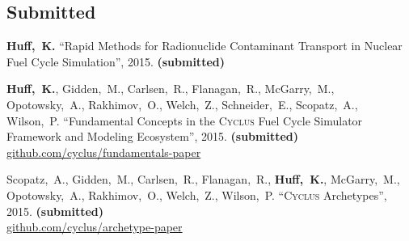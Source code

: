 \documentclass[margin,line]{resume}
\newcommand{\Cyclus}{\textsc{Cyclus}\xspace}%
\begin{document}
\begin{resume}
    \section{\mysidestyle Submitted}
      \begin{bibenum}
       \item \textbf{Huff,~K.} ``Rapid Methods for Radionuclide Contaminant
       Transport in Nuclear Fuel Cycle Simulation'', 2015. \textbf{(submitted)}
       \item \textbf{Huff,~K.}, Gidden,~M., Carlsen,~R., Flanagan,~R.,
       McGarry,~M., Opotowsky,~A., Rakhimov,~O., Welch,~Z., Schneider,~E.,
       Scopatz,~A., Wilson,~P.  ``Fundamental Concepts in the \Cyclus Fuel Cycle
       Simulator Framework and Modeling Ecosystem'', 2015.  \textbf{(submitted)}\\
       \url{github.com/cyclus/fundamentals-paper}
       \item Scopatz,~A., Gidden,~M., Carlsen,~R., Flanagan,~R.,
       \textbf{Huff,~K.}, McGarry,~M., Opotowsky,~A., Rakhimov,~O., Welch,~Z.,
       Wilson,~P.  ``\Cyclus Archetypes'', 2015. \textbf{(submitted)} \\
       \url{github.com/cyclus/archetype-paper}
      \end{bibenum}

\end{resume}
\end{document}
